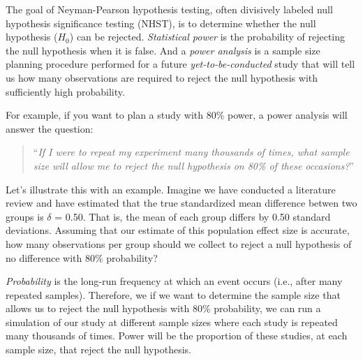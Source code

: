 \documentclass[
]{book}
\begin{document}
The goal of Neyman-Pearson hypothesis testing, often divisively labeled null hypothesis significance testing (NHST), is to determine whether the null hypothesis (\(H_0\)) can be rejected. \emph{Statistical power} is the probability of rejecting the null hypothesis when it is false. And a \emph{power analysis} is a sample size planning procedure performed for a future \emph{yet-to-be-conducted} study that will tell us how many observations are required to reject the null hypothesis with sufficiently high probability.

For example, if you want to plan a study with 80\% power, a power analysis will answer the question:

\begin{quote}
``\emph{If I were to repeat my experiment many thousands of times, what sample size will allow me to reject the null hypothesis on 80\% of these occasions?}''
\end{quote}

Let's illustrate this with an example. Imagine we have conducted a literature review and have estimated that the true standardized mean difference betwen two groups is \(\delta\) = 0.50. That is, the mean of each group differs by 0.50 standard deviations. Assuming that our estimate of this population effect size is accurate, how many observations per group should we collect to reject a null hypothesis of no difference with 80\% probability?

\emph{Probability} is the long-run frequency at which an event occurs (i.e., after many repeated samples). Therefore, we if we want to determine the sample size that allows us to reject the null hypothesis with 80\% probability, we can run a simulation of our study at different sample sizes where each study is repeated many thousands of times. Power will be the proportion of these studies, at each sample size, that reject the null hypothesis.
\end{document}
